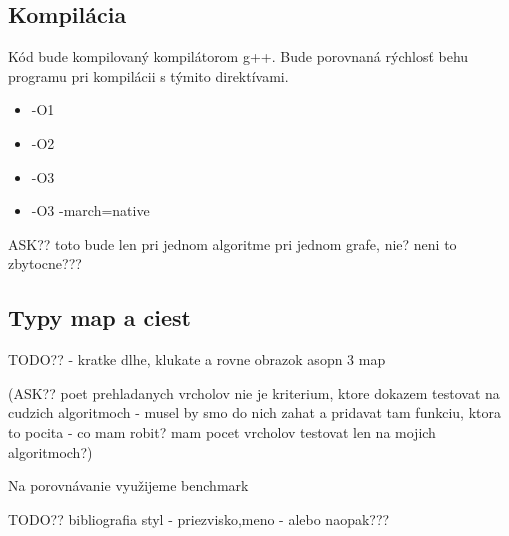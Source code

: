 \subsection{Kompilácia}
Kód bude kompilovaný kompilátorom g++. Bude porovnaná
rýchlosť behu programu pri kompilácii s týmito direktívami.
\begin{itemize}
\item -O1
\item -O2
\item -O3
\item -O3 -march=native
\end{itemize}
ASK?? toto bude len pri jednom algoritme pri jednom grafe, nie? neni to zbytocne???

\subsection{Typy map a ciest}
TODO?? - kratke dlhe, klukate a rovne obrazok asopn 3 map





(ASK?? poet prehladanych vrcholov nie je kriterium, ktore dokazem testovat na cudzich algoritmoch - musel by smo do nich zahat a pridavat tam funkciu, ktora to pocita - co mam robit? mam pocet vrcholov testovat len na mojich algoritmoch?)




Na porovnávanie využijeme benchmark

TODO?? bibliografia styl - priezvisko,meno - alebo naopak???